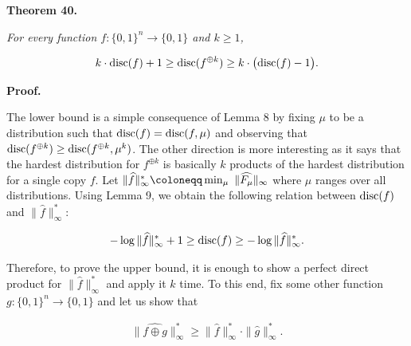 

\par\medskip\noindent\textbf{
\textbf{Theorem 40}\textbf{.}
}\par



\emph{For every function $f\colon\{0,1\}^{n}\to\{0,1\}$ and $k\geq 1$,}\par


\[\begin{gathered}
k\cdot{\textup{disc}}(f)+1\geq{\textup{disc}}(f^{\oplus k})\geq k\cdot\big{(}{\textup{disc}}(f)-1\big{)}.
\end{gathered}\]






\par\medskip\noindent\textbf{Proof.}\par




The lower bound is a simple consequence of Lemma 8 by fixing $\mu$ to be a distribution such that ${\textup{disc}}(f)={\textup{disc}}(f,\mu)$ and observing that ${\textup{disc}}(f^{\oplus k})\geq{\textup{disc}}(f^{\oplus k},\mu^{k})$. The other direction is more interesting as it says that the hardest distribution for $f^{\oplus k}$ is basically $k$ products of the hardest distribution for a single copy $f$. Let $\|\widehat{f}\|_{\infty}^{*}\coloneqq\min_{\mu}\nobreak\ \|\widehat{F_{\mu}}\|_{\infty}$ where $\mu$ ranges over all distributions. Using Lemma 9, we obtain the following relation between ${\textup{disc}}(f)$ and $\|\widehat{f}\|_{\infty}^{*}$:\par


\[\begin{gathered}
-\log\|\widehat{f}\|_{\infty}^{*}+1\geq{\textup{disc}}(f)\geq-\log\|\widehat{f}\|_{\infty}^{*}.
\end{gathered}\]


Therefore, to prove the upper bound, it is enough to show a perfect direct product for $\|\widehat{f}\|_{\infty}^{*}$ and apply it $k$ time. To this end, fix some other function $g:\{0,1\}^{n}\to\{0,1\}$ and let us show that\par


\[\begin{gathered}
\|\widehat{f\oplus g}\|_{\infty}^{*}\geq\|\widehat{f}\|_{\infty}^{*}\cdot\|\widehat{g}\|_{\infty}^{*}.
\end{gathered}\]


